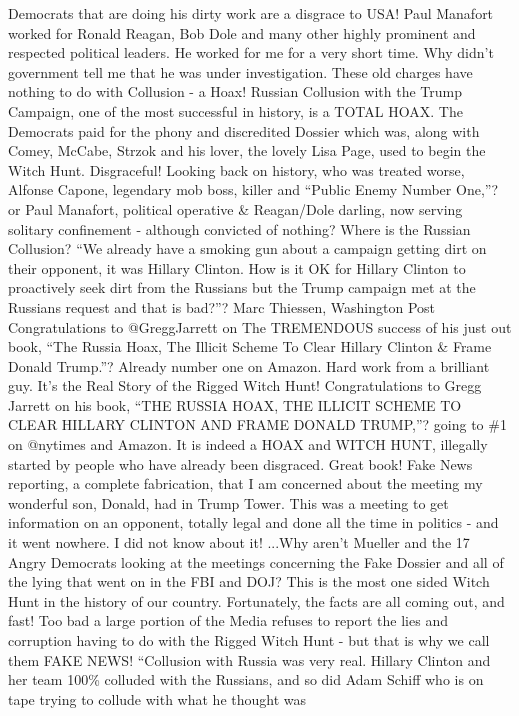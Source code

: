 Democrats that are doing his dirty work are a disgrace to USA! Paul
Manafort worked for Ronald Reagan, Bob Dole and many other highly
prominent and respected political leaders. He worked for me for a very
short time. Why didn't government tell me that he was under
investigation. These old charges have nothing to do with Collusion - a
Hoax! Russian Collusion with the Trump Campaign, one of the most
successful in history, is a TOTAL HOAX. The Democrats paid for the phony
and discredited Dossier which was, along with Comey, McCabe, Strzok and
his lover, the lovely Lisa Page, used to begin the Witch Hunt.
Disgraceful! Looking back on history, who was treated worse, Alfonse
Capone, legendary mob boss, killer and ``Public Enemy Number One,''? or
Paul Manafort, political operative \& Reagan/Dole darling, now serving
solitary confinement - although convicted of nothing? Where is the
Russian Collusion? ``We already have a smoking gun about a campaign
getting dirt on their opponent, it was Hillary Clinton. How is it OK for
Hillary Clinton to proactively seek dirt from the Russians but the Trump
campaign met at the Russians request and that is bad?''? Marc Thiessen,
Washington Post Congratulations to @GreggJarrett on The TREMENDOUS
success of his just out book, ``The Russia Hoax, The Illicit Scheme To
Clear Hillary Clinton \& Frame Donald Trump.''? Already number one on
Amazon. Hard work from a brilliant guy. It's the Real Story of the
Rigged Witch Hunt! Congratulations to Gregg Jarrett on his book, ``THE
RUSSIA HOAX, THE ILLICIT SCHEME TO CLEAR HILLARY CLINTON AND FRAME
DONALD TRUMP,''? going to \#1 on @nytimes and Amazon. It is indeed a
HOAX and WITCH HUNT, illegally started by people who have already been
disgraced. Great book! Fake News reporting, a complete fabrication, that
I am concerned about the meeting my wonderful son, Donald, had in Trump
Tower. This was a meeting to get information on an opponent, totally
legal and done all the time in politics - and it went nowhere. I did not
know about it! ...Why aren't Mueller and the 17 Angry Democrats looking
at the meetings concerning the Fake Dossier and all of the lying that
went on in the FBI and DOJ? This is the most one sided Witch Hunt in the
history of our country. Fortunately, the facts are all coming out, and
fast! Too bad a large portion of the Media refuses to report the lies
and corruption having to do with the Rigged Witch Hunt - but that is why
we call them FAKE NEWS! ``Collusion with Russia was very real. Hillary
Clinton and her team 100\% colluded with the Russians, and so did Adam
Schiff who is on tape trying to collude with what he thought was
